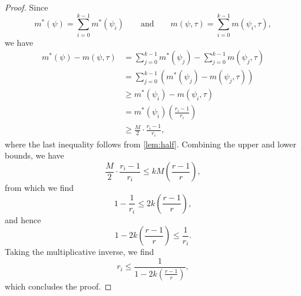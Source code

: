 \documentclass[]{article}
\begin{document}
\begin{proof}
  Since
  \begin{equation*}
    m^*(\psi) = \sum_{i = 0}^{k - 1}{m^*(\psi_i)} \qquad \text{and} \qquad m(\psi, \tau) = \sum_{i = 0}^{k - 1}{m(\psi_i, \tau)},
  \end{equation*}
  we have
  \begin{align*}
    m^*(\psi) - m(\psi, \tau) & = \sum_{j = 0}^{k - 1}{m^*(\psi_j)} - \sum_{j = 0}^{k - 1}{m(\psi_j, \tau)} \\
    & = \sum_{j = 0}^{k - 1}{\left(m^*(\psi_j) - m(\psi_j, \tau)\right)} \\
    & \geq m^*(\psi_i) - m(\psi_i, \tau) \\
    & = m^*(\psi_i) \left(\frac{r_i - 1}{r_i}\right) \\
    & \geq \frac{M}{2} \cdot \frac{r_i - 1}{r_i},
  \end{align*}
  where the last inequality follows from \autoref{lem:half}.
  Combining the upper and lower bounds, we have
  \begin{equation*}
    \frac{M}{2} \cdot \frac{r_i - 1}{r_i} \leq kM \left(\frac{r - 1}{r}\right),
  \end{equation*}
  from which we find
  \begin{equation*}
    1 - \frac{1}{r_i} \leq 2k\left(\frac{r - 1}{r}\right),
  \end{equation*}
  and hence
  \begin{equation*}
    1 - 2k\left(\frac{r - 1}{r}\right) \leq \frac{1}{r_i}.
  \end{equation*}
  Taking the multiplicative inverse, we find
  \begin{equation*}
    r_i \leq \frac{1}{1 - 2k\left(\frac{r - 1}{r}\right)},
  \end{equation*}
  which concludes the proof.
\end{proof}
\end{document}
